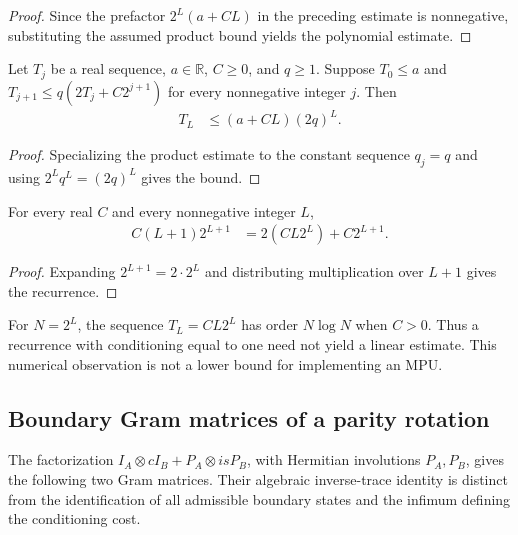 \begin{proof}\leanok
    Since the prefactor $2^L(a+CL)$ in the preceding estimate is
    nonnegative, substituting the assumed product bound yields the
    polynomial estimate.
\end{proof}

\begin{lemma}
    \label{thm:mpu_tree_depth_constant}
    \leanok
    Let $T_j$ be a real sequence, $a\in\mathbb R$, $C\geq0$, and $q\geq1$.
    Suppose $T_0\leq a$ and $T_{j+1}\leq q(2T_j+C2^{j+1})$ for every
    nonnegative integer $j$. Then
    \begin{align}
        T_L & \leq (a+CL)(2q)^L.
    \end{align}
\end{lemma}

\begin{proof}\leanok
    Specializing the product estimate to the constant sequence $q_j=q$ and
    using $2^Lq^L=(2q)^L$ gives the bound.
\end{proof}

\begin{lemma}
    \label{thm:mpu_tree_depth_endpoint}
    \leanok
    For every real $C$ and every nonnegative integer $L$,
    \begin{align}
        C(L+1)2^{L+1} & =2(CL2^L)+C2^{L+1}.
    \end{align}
\end{lemma}

\begin{proof}\leanok
    Expanding $2^{L+1}=2\cdot2^L$ and distributing multiplication over
    $L+1$ gives the recurrence.
\end{proof}

For $N=2^L$, the sequence $T_L=CL2^L$ has order $N\log N$ when $C>0$.
Thus a recurrence with conditioning equal to one need not yield a linear
estimate. This numerical observation is not a lower bound for implementing
an MPU.

\subsection{Boundary Gram matrices of a parity rotation}

The factorization $I_A\otimes cI_B+P_A\otimes isP_B$, with Hermitian
involutions $P_A,P_B$, gives the following two Gram matrices. Their
algebraic inverse-trace identity is distinct from the identification of all
admissible boundary states and the infimum defining the conditioning cost.

